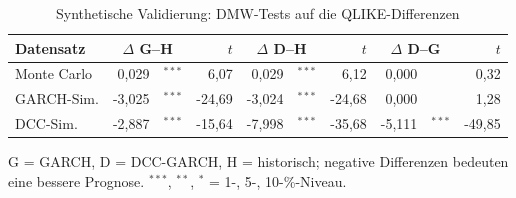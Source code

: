 \begin{table}[htbp]
  \centering
  \footnotesize
  \begin{tabular}{lr@{}lrr@{}lrr@{}lr}
    \toprule
    Datensatz & \multicolumn{2}{c}{$\Delta$ G--H} & $t$ & \multicolumn{2}{c}{$\Delta$ D--H} & $t$ & \multicolumn{2}{c}{$\Delta$ D--G} & $t$ \\
    \midrule
    Monte Carlo & 0,029 & $^{***}$ & 6,07 & 0,029 & $^{***}$ & 6,12 & 0,000 &  & 0,32 \\
    GARCH-Sim. & -3,025 & $^{***}$ & -24,69 & -3,024 & $^{***}$ & -24,68 & 0,000 &  & 1,28 \\
    DCC-Sim. & -2,887 & $^{***}$ & -15,64 & -7,998 & $^{***}$ & -35,68 & -5,111 & $^{***}$ & -49,85 \\
    \bottomrule
  \end{tabular}
  \caption{Synthetische Validierung: DMW-Tests auf die QLIKE-Differenzen}
  \label{tab:synth_dmw}
  \begin{minipage}{\linewidth}\vspace{0.4em}\centering\footnotesize
  G = GARCH, D = DCC-GARCH, H = historisch; negative Differenzen bedeuten eine bessere Prognose. $^{***}$, $^{**}$, $^{*}$ = 1-, 5-, 10-\%-Niveau.
  \end{minipage}
\end{table}
